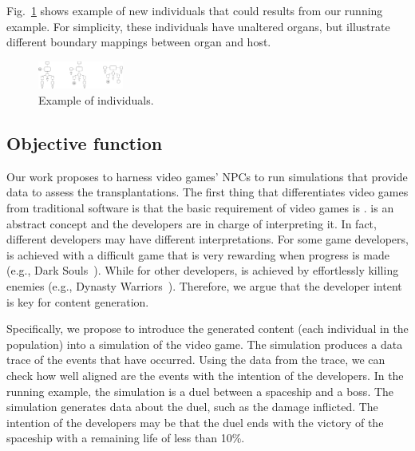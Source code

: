 Fig.~\ref{fig:candidates} shows example of new individuals that could results from our running example. For simplicity, these individuals have unaltered organs, but illustrate different boundary mappings between organ and host.

\begin{figure}[tb]
    \centering
    \includegraphics[width=0.25\textwidth]{Figures/candidates.png}
    \caption{Example of individuals.}
    \label{fig:candidates}
\end{figure}

\subsection{Objective function}

Our work proposes to harness video games' NPCs to run simulations that provide data to assess the transplantations. The first thing that differentiates video games from traditional software is that the basic requirement of video games is .  is an abstract concept and the developers are in charge of interpreting it. In fact, different developers may have different interpretations. For some game developers,  is achieved with a difficult game that is very rewarding when progress is made (e.g., Dark Souls~\cite{darksouls}). While for other developers,  is achieved by effortlessly killing enemies (e.g., Dynasty Warriors~\cite{dynastywarriors}). Therefore, we argue that the developer intent is key for content generation.

Specifically, we propose to introduce the generated content (each individual in the population) into a simulation of the video game. The simulation produces a data trace of the events that have occurred. Using the data from the trace, we can check how well aligned are the events with the intention of the developers. In the running example, the simulation is a duel between a spaceship and a boss. The simulation generates data about the duel, such as the damage inflicted. The intention of the developers may be that the duel ends with the victory of the spaceship with a remaining life of less than 10\%.

